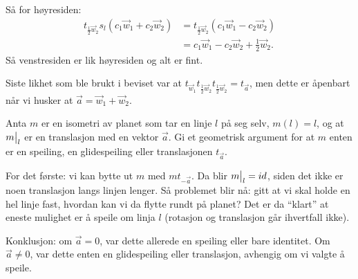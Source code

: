 \documentclass[11pt, norsk]{article}
\begin{document}
\begin{losn}
Så for høyresiden:
\begin{align*}
  t_{\frac 12 \vec w_2}s_l(c_1 \vec w_1 + c_2 \vec w_2) &= t_{\frac 12 \vec w_2}(c_1 \vec w_1 - c_2\vec w_2) \\
&= c_1 \vec w_1 -c_2 \vec w_2 + \frac 12 \vec w_2.
\end{align*}
Så venstresiden er lik høyresiden og alt er fint.

Siste likhet som ble brukt i beviset var at $t_{\vec w_1}t_{\frac 12 \vec w_2}t_{\frac 12 \vec w_2}=t_{\vec a}$, men dette er åpenbart når vi husker at $\vec a = \vec w_1 + \vec w_2$.
\end{losn}

\begin{oppg}
 Anta $m$ er en isometri av planet som tar en linje $l$ på seg selv, $m(l)=l$, og at $\restr{m}{l}$ er en translasjon med en vektor $\vec a$. Gi et geometrisk argument for at $m$ enten er en speiling, en glidespeiling eller translasjonen $t_{\vec a}$.
\end{oppg}

\begin{losn}
For det første: vi kan bytte ut $m$ med $mt_{-\vec a}$. Da blir $\restr{m}{l}=id$, siden det ikke er noen translasjon langs linjen lenger. Så problemet blir nå: gitt at vi skal holde en hel linje fast, hvordan kan vi da flytte rundt på planet? Det er da ``klart'' at eneste mulighet er å speile om linja $l$ (rotasjon og translasjon går ihvertfall ikke).

Konklusjon: om $\vec a=0$, var dette allerede en speiling eller bare identitet. Om $\vec a \neq 0$, var dette enten en glidespeiling eller translasjon, avhengig om vi valgte å speile.
\end{losn}

\begin{oppg}
  
\end{oppg}
\end{document}
